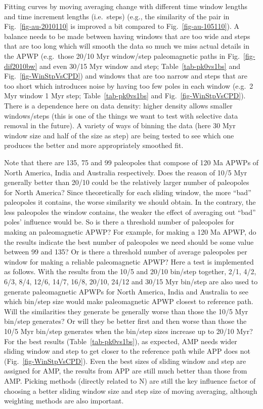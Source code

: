 Fitting curves by moving averaging change with different time window lengths and
time increment lengths (i.e.\ steps) (e.g., the similarity of the pair in
Fig.~\ref{fig-au-2010110} is improved a bit compared to
Fig.~\ref{fig-au-105110}). A balance needs to be made between having windows
that are too wide and steps that are too long which will smooth the data so much
we miss actual details in the APWP (e.g.\ those 20/10 Myr window/step
paleomagnetic paths in Fig.~\ref{fig-dif2010bw} and even 30/15 Myr window and
step; Table~\ref{tab-pk0vs1bs} and Fig.~\ref{fig-WinStpVsCPD}) and windows that
are too narrow and steps that are too short which introduces noise by having too
few poles in each window (e.g.\ 2 Myr window 1 Myr step;
Table~\ref{tab-pk0vs1bs} and Fig.~\ref{fig-WinStpVsCPD}). There is a dependence
here on data density: higher density allows smaller windows/steps (this is one
of the things we want to test with selective data removal in the future). A
variety of ways of binning the data (here 30 Myr window size and
half of the size as step) are being tested to see which one produces the better
and more appropriately smoothed fit.

Note that there are 135, 75 and 99 paleopoles that compose of 120 Ma
APWPs of North America, India and Australia respectively. Does the reason of
10/5 Myr generally better than 20/10 could be the relatively larger number of
paleopoles for North America? Since theoretically for each sliding window, the
more ``bad'' paleopoles it contains, the worse similarity we should obtain. In
the contrary, the less paleopoles the window contains, the weaker the effect of
averaging out ``bad'' poles' influence would be. So is there a threshold number
of paleopoles for making an paleomagnetic APWP\@? For example, for making a
120 Ma APWP, do the results indicate the best number of paleopoles
we need should be some value between 99 and 135? Or is there a threshold number
of average paleopoles per window for making a reliable paleomagnetic APWP\@?
Here a test is implemented as
follows. With the results from the 10/5 and 20/10 bin/step together, 2/1, 4/2,
6/3, 8/4, 12/6, 14/7, 16/8, 20/10, 24/12 and 30/15 Myr bin/step are also used to
generate paleomagnetic APWPs for North America, India and Australia to see which
bin/step size would make paleomagnetic APWP closest to reference path. Will the
similarities they generate be generally worse than those the 10/5 Myr bin/step
generates? Or will they be better first and then worse than those the 10/5 Myr
bin/step generates when the bin/step sizes increase up to 20/10 Myr? For the
best results (Table~\ref{tab-pk0vs1bs}), as expected, AMP needs wider sliding
window and step to get closer to the reference path while APP does not
(Fig.~\ref{fig-WinStpVsCPD}). Even the best sizes of sliding window and step are
assigned for AMP, the results from APP are still much better than those from
AMP\@. Picking methods (directly related to N) are still the key influence
factor of choosing a better sliding window size and step size of moving
averaging, although weighting methods are also important.

